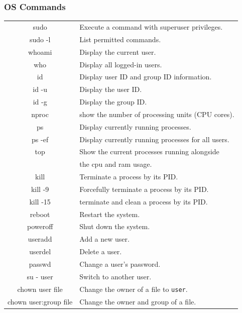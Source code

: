 \documentclass[10pt]{article}
\begin{document}
\begin{multicols}{2}
\subsubsection{OS Commands}
\begin{tabular}{C L}
    sudo                    & Execute a command with superuser privileges. \\
    sudo -l                 & List permitted commands. \\
    whoami                  & Display the current user. \\
    who                     & Display all logged-in users. \\
    id                      & Display user ID and group ID information. \\
    id -u                   & Display the user ID. \\
    id -g                   & Display the group ID. \\
    nproc                   & show the number of processing units (CPU cores).\\
    ps                      & Display currently running processes. \\
    ps -ef                  & Display currently running processes for all users. \\
    top                     & Show the current processes running alongside\\
                            & the cpu and ram usage.\\
    kill                    & Terminate a process by its PID. \\
    kill -9                 & Forcefully terminate a process by its PID. \\
    kill -15                & terminate and clean a process by its PID. \\
    reboot                  & Restart the system. \\
    poweroff                & Shut down the system. \\
    useradd                 & Add a new user. \\
    userdel                 & Delete a user. \\
    passwd                  & Change a user's password. \\
    su - user               & Switch to another user. \\
    chown user file         & Change the owner of a file to \texttt{user}. \\
    chown user:group file   & Change the owner and group of a file. \\

\end{tabular}
\end{multicols}
\end{document}
